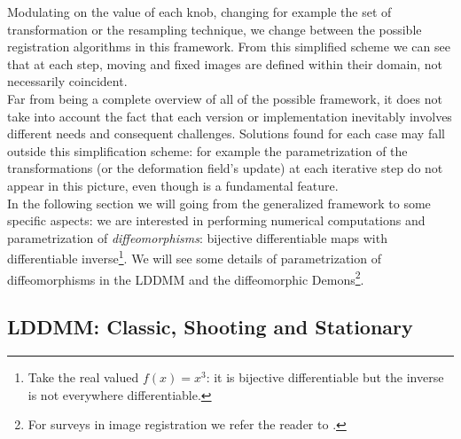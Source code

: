 \noindent
Modulating on the value of each knob, changing for example the set of transformation or the resampling technique, we change between the possible registration algorithms in this framework.
From this simplified scheme we can see that at each step, moving and fixed images are defined within their domain, not necessarily coincident. \\

%
\noindent
Far from being a complete overview of all of the possible framework, it does not take into account the fact that each version or implementation inevitably involves different needs and consequent challenges. Solutions found for each case may fall outside this simplification scheme: for example the parametrization of the transformations (or the deformation field's update) at each iterative step do not appear in this picture, even though is a fundamental feature. \\
In the following section we will going from the generalized framework to some specific aspects: we are interested in performing numerical computations and parametrization of \emph{diffeomorphisms}: bijective differentiable maps with differentiable inverse\footnote{Take the real valued $f(x)=x^3$: it is bijective differentiable but the inverse is not everywhere differentiable.}. We will see some details of parametrization of diffeomorphisms in the LDDMM and the diffeomorphic Demons\footnote{For surveys in image registration we refer the reader to \cite{Sotiras:survey:13, Hill:survey:01}.}.

\subsection{LDDMM: Classic, Shooting and Stationary}

